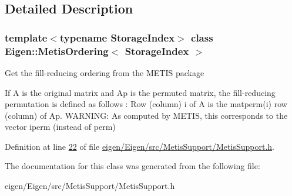 \subsection{Detailed Description}
\subsubsection*{template$<$typename Storage\+Index$>$\newline
class Eigen\+::\+Metis\+Ordering$<$ Storage\+Index $>$}

Get the fill-\/reducing ordering from the M\+E\+T\+IS package

If A is the original matrix and Ap is the permuted matrix, the fill-\/reducing permutation is defined as follows \+: Row (column) i of A is the matperm(i) row (column) of Ap. W\+A\+R\+N\+I\+NG\+: As computed by M\+E\+T\+IS, this corresponds to the vector iperm (instead of perm) 

Definition at line \hyperlink{eigen_2_eigen_2src_2_metis_support_2_metis_support_8h_source_l00022}{22} of file \hyperlink{eigen_2_eigen_2src_2_metis_support_2_metis_support_8h_source}{eigen/\+Eigen/src/\+Metis\+Support/\+Metis\+Support.\+h}.



The documentation for this class was generated from the following file\+:\begin{DoxyCompactItemize}
\item 
eigen/\+Eigen/src/\+Metis\+Support/\+Metis\+Support.\+h\end{DoxyCompactItemize}
